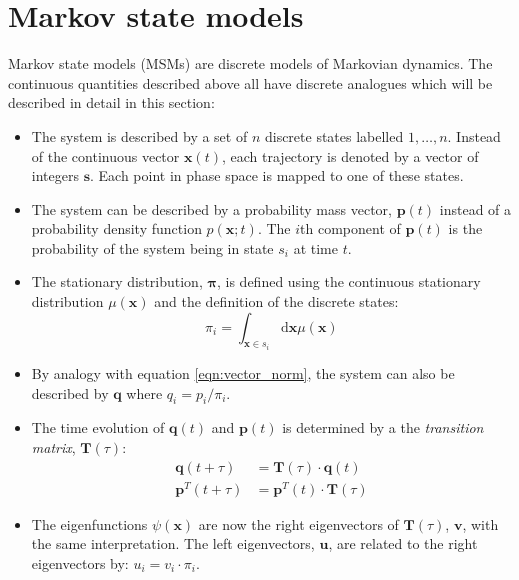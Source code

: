 
\section{Markov state models}

Markov state models (MSMs) are discrete models of Markovian dynamics. The continuous quantities described above all have discrete analogues which will be described in detail in this section: 

\begin{itemize}
    \item The system is described by a set of $n$ discrete states labelled $1, \ldots, n$. Instead of the continuous vector $\mathbf{x}(t)$, each trajectory is denoted by a vector of integers $\mathbf{s}$. Each point in phase space is mapped to one of these states. 
    \item The system can be described by a probability mass vector, $\mathbf{p}(t)$  instead of a probability density function $p(\mathbf{x};t)$. The $i$th component of $\mathbf{p}(t)$ is the probability of the system being in  state $s_{i}$ at time $t$.
    \item The stationary distribution, $\bm{\pi}$, is defined using the continuous stationary distribution $\mu(\mathbf{x})$ and the definition of the discrete states: 
        \begin{equation}
            \pi_{i}=\int_{\mathbf{x} \in s_{i}} \mathrm{d}\mathbf{x}\mu(\mathbf{x})
        \end{equation}
    \item By analogy with equation \ref{eqn:vector_norm}, the system can also be described by $\mathbf{q}$ where $q_{i} = p_{i}/\pi_{i}$.
    \item The time evolution of $\mathbf{q}(t)$ and $\mathbf{p}(t)$ is determined by a the \emph{transition matrix}, $\mathbf{T}(\tau)$:
        \begin{align}
            \mathbf{q}(t+\tau) &= \mathbf{T}(\tau) \cdot \mathbf{q}(t) \\
            \mathbf{p}^{T}(t+\tau) & = \mathbf{p}^{T}(t)\cdot \mathbf{T}(\tau)
        \end{align}
    \item The eigenfunctions $\psi(\mathbf{x})$ are now the right eigenvectors of $\mathbf{T}(\tau)$, $\mathbf{v}$, with the same interpretation. The left eigenvectors, $\mathbf{u}$, are related to the right eigenvectors by: $u_{i} = v_{i}\cdot \pi_{i}$.  
 \end{itemize}

